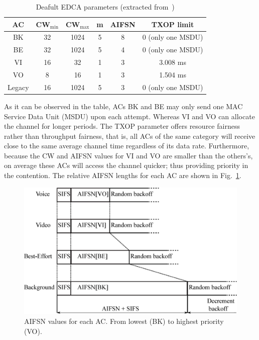 	\begin{table}
		\centering
		\caption{Deafult EDCA parameters (extracted from~\cite{perahia2013next})}
		\label{tab:EDCAparams}
		\begin{tabular}{|c|c|c|c|c|c|}
			\hline
			{\bfseries AC} & {\bfseries CW$_{\min}$} & {\bfseries CW$_{\max}$} &		{\bfseries m}		& {\bfseries AIFSN} & {\bfseries TXOP limit}\\
			\hline
			BK 		       & 		32			&		1024		   &			5			& 		8		  &		0 (only one MSDU)\\
			BE 		       & 		32			&		1024		   &			5			& 		4		  &		0 (only one MSDU)	\\
			VI 		       & 		16			&		32		  	   &			1			& 		3		  &		3.008 ms		\\
			VO 		       & 		8			&		16		  	   &			1			& 		3		  &		1.504 ms		\\
			Legacy	       & 		16			&		1024	  	   &			5			& 		3		  &		0 (only one MSDU)\\
			\hline
		\end{tabular}
	\end{table}

As it can be observed in the table, ACs BK and BE may only send one MAC Service Data Unit (MSDU) upon each attempt. Whereas VI and VO can allocate the channel for longer periods. The TXOP parameter offers resource fairness rather than throughput fairness, that is, all ACs of the same category will receive close to the same average channel time regardless of its data rate. Furthermore, because the CW and AIFSN values for VI and VO are smaller than the others's, on average these ACs will access the channel quicker; thus providing priority in the contention. The relative AIFSN lengths for each AC are shown in Fig.~\ref{fig:AIFSN}.

	\begin{figure}[tb]
	\centering
		\includegraphics[width=\linewidth]{figures/AIFSN.eps}
		\caption{AIFSN values for each AC. From lowest (BK) to highest priority (VO).}
		\label{fig:AIFSN}
	\end{figure}


